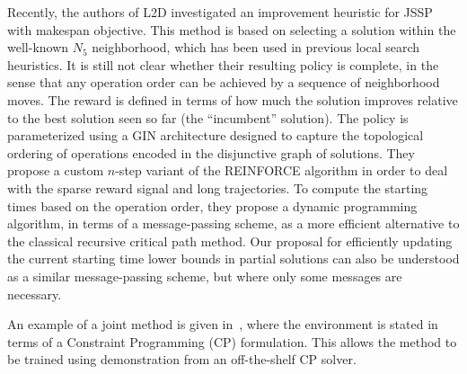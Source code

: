 \documentclass{article}
\theoremstyle{definition}
\theoremstyle{plain}
\begin{document}
Recently, the authors of L2D investigated an improvement heuristic for
JSSP~\cite{zhangDeepReinforcementLearning2024} with makespan objective.
%
This method is based on selecting a solution within the well-known $N_5$
neighborhood, which has been used in previous local search heuristics.
%
It is still not clear whether their resulting policy is complete, in the sense
that any operation order can be achieved by a sequence of neighborhood moves.
%
The reward is defined in terms of how much the solution improves relative to the
best solution seen so far (the ``incumbent'' solution). The policy is
parameterized using a GIN architecture designed to capture the topological
ordering of operations encoded in the disjunctive graph of solutions. They
propose a custom $n$-step variant of the REINFORCE algorithm in order to deal
with the sparse reward signal and long trajectories.
%
To compute the starting times based on the operation order, they propose a
dynamic programming algorithm, in terms of a message-passing scheme, as a more
efficient alternative to the classical recursive critical path method.
%
Our proposal for efficiently updating the current starting time lower bounds in
partial solutions can also be understood as a similar message-passing scheme,
but where only some messages are necessary.

An example of a joint method is given in~\cite{tasselEndEndReinforcementLearning2023}, where the environment is stated in
terms of a Constraint Programming (CP) formulation. This allows the method to be
trained using demonstration from an off-the-shelf CP solver.
\end{document}
